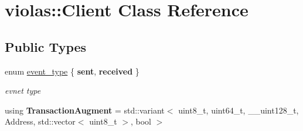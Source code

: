 \hypertarget{classviolas_1_1_client}{}\section{violas\+:\+:Client Class Reference}
\label{classviolas_1_1_client}
\subsection*{Public Types}
\begin{DoxyCompactItemize}
\item 
\mbox{\label{classviolas_1_1_client_adee90625a7043bafdbb30931d564f6f4}} 
enum \hyperlink{classviolas_1_1_client_adee90625a7043bafdbb30931d564f6f4}{event\+\_\+type} \{ {\bfseries sent}, 
{\bfseries received}
 \}\begin{DoxyCompactList}\small\item\em evnet type \end{DoxyCompactList}
\item 
\mbox{\label{classviolas_1_1_client_aff66e6c69ae05d46ffb9fff703b1018f}} 
using {\bfseries Transaction\+Augment} = std\+::variant$<$ uint8\+\_\+t, uint64\+\_\+t, \+\_\+\+\_\+uint128\+\_\+t, Address, std\+::vector$<$ uint8\+\_\+t $>$, bool $>$
\end{DoxyCompactItemize}
